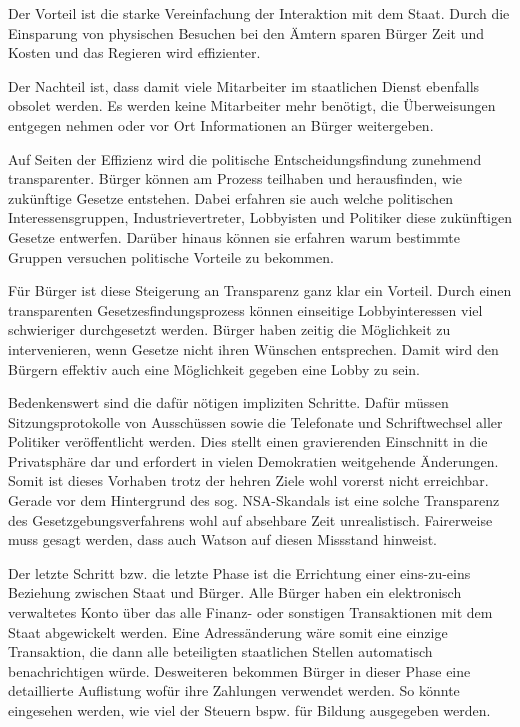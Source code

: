\documentclass[12pt,twoside,ngerman]{scrartcl}
\theoremstyle{plain}
\theoremstyle{definition}
\theoremstyle{remark}
\begin{document}
	Der Vorteil ist die starke Vereinfachung der Interaktion mit dem Staat. Durch die Einsparung von physischen Besuchen bei den Ämtern sparen Bürger Zeit und Kosten und das Regieren wird effizienter.
	
	Der Nachteil ist, dass damit viele Mitarbeiter im staatlichen Dienst ebenfalls obsolet werden. Es werden keine Mitarbeiter mehr benötigt, die Überweisungen entgegen nehmen oder vor Ort Informationen an Bürger weitergeben.
	
	Auf Seiten der Effizienz wird die politische Entscheidungsfindung zunehmend transparenter. Bürger können am Prozess teilhaben und herausfinden, wie zukünftige Gesetze entstehen. Dabei erfahren sie auch welche politischen Interessensgruppen, Industrievertreter, Lobbyisten und Politiker diese zukünftigen Gesetze entwerfen. Darüber hinaus können sie erfahren warum bestimmte Gruppen versuchen politische Vorteile zu bekommen.
	
	Für Bürger ist diese Steigerung an Transparenz ganz klar ein Vorteil. Durch einen transparenten Gesetzesfindungsprozess können einseitige Lobbyinteressen viel schwieriger durchgesetzt werden. Bürger haben zeitig die Möglichkeit zu intervenieren, wenn Gesetze nicht ihren Wünschen entsprechen. Damit wird den Bürgern effektiv auch eine Möglichkeit gegeben eine Lobby zu sein.
	
	Bedenkenswert sind die dafür nötigen impliziten Schritte. Dafür müssen Sitzungsprotokolle von Ausschüssen sowie die Telefonate und Schriftwechsel aller Politiker veröffentlicht werden. Dies stellt einen gravierenden Einschnitt in die Privatsphäre dar und erfordert in vielen Demokratien weitgehende Änderungen. Somit ist dieses Vorhaben trotz der hehren Ziele wohl vorerst nicht erreichbar. Gerade vor dem Hintergrund des sog. NSA-Skandals ist eine solche Transparenz des Gesetzgebungsverfahrens wohl auf absehbare Zeit unrealistisch.
	Fairerweise muss gesagt werden, dass auch Watson auf diesen Missstand hinweist.
	
	Der letzte Schritt bzw. die letzte Phase ist die Errichtung einer eins-zu-eins Beziehung zwischen Staat und Bürger. Alle Bürger haben ein elektronisch verwaltetes Konto über das alle Finanz- oder sonstigen Transaktionen mit dem Staat abgewickelt werden. Eine Adressänderung wäre somit eine einzige Transaktion, die dann alle beteiligten staatlichen Stellen automatisch benachrichtigen würde.
	Desweiteren bekommen Bürger in dieser Phase eine detaillierte Auflistung wofür ihre Zahlungen verwendet werden. So könnte eingesehen werden, wie viel der Steuern bspw. für Bildung ausgegeben werden.
	
\end{document}
